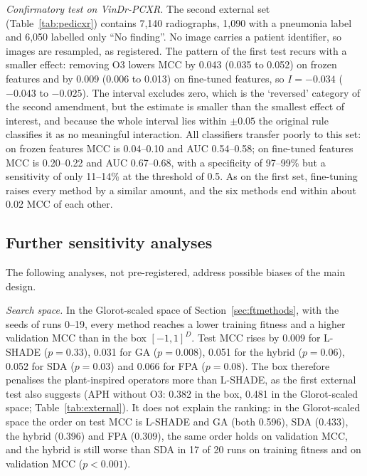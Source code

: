 \documentclass[10pt,letterpaper]{article}
\begin{document}


\emph{Confirmatory test on VinDr-PCXR.} The second external set (Table~\ref{tab:pedicxr}) contains 7,140 radiographs, 1,090 with a pneumonia label and 6,050 labelled only ``No finding''. No image carries a patient identifier, so images are resampled, as registered. The pattern of the first test recurs with a smaller effect: removing O3 lowers MCC by 0.043 (0.035 to 0.052) on frozen features and by 0.009 (0.006 to 0.013) on fine-tuned features, so $I=-0.034$ ($-0.043$ to $-0.025$). The interval excludes zero, which is the `reversed' category of the second amendment, but the estimate is smaller than the smallest effect of interest, and because the whole interval lies within $\pm0.05$ the original rule classifies it as no meaningful interaction. All classifiers transfer poorly to this set: on frozen features MCC is 0.04--0.10 and AUC 0.54--0.58; on fine-tuned features MCC is 0.20--0.22 and AUC 0.67--0.68, with a specificity of 97--99\% but a sensitivity of only 11--14\% at the threshold of 0.5. As on the first set, fine-tuning raises every method by a similar amount, and the six methods end within about 0.02 MCC of each other.



\subsection{Further sensitivity analyses}\label{sec:sensitivity}
The following analyses, not pre-registered, address possible biases of the main design.

\emph{Search space.} In the Glorot-scaled space of Section~\ref{sec:ftmethods}, with the seeds of runs 0--19, every method reaches a lower training fitness and a higher validation MCC than in the box $[-1,1]^D$. Test MCC rises by 0.009 for L-SHADE ($p=0.33$), 0.031 for GA ($p=0.008$), 0.051 for the hybrid ($p=0.06$), 0.052 for SDA ($p=0.03$) and 0.066 for FPA ($p=0.08$). The box therefore penalises the plant-inspired operators more than L-SHADE, as the first external test also suggests (APH without O3: 0.382 in the box, 0.481 in the Glorot-scaled space; Table~\ref{tab:external}). It does not explain the ranking: in the Glorot-scaled space the order on test MCC is L-SHADE and GA (both 0.596), SDA (0.433), the hybrid (0.396) and FPA (0.309), the same order holds on validation MCC, and the hybrid is still worse than SDA in 17 of 20 runs on training fitness and on validation MCC ($p<0.001$).
\end{document}
